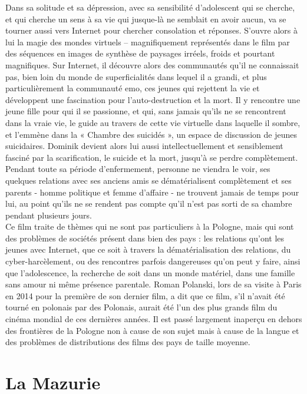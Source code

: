 \documentclass[12pt]{amsart}
\begin{document}
Dans sa solitude et sa dépression, avec sa sensibilité d’adolescent qui se cherche, et qui cherche un sens à sa vie qui jusque-là ne semblait en avoir aucun, va se tourner aussi vers Internet pour chercher consolation et réponses. S’ouvre alors à lui la magie des mondes virtuels – magnifiquement représentés dans le film par des séquences en images de synthèse de paysages irréels, froids et pourtant magnifiques. Sur Internet, il découvre alors des communautés qu’il ne connaissait pas, bien loin du monde de superficialités dans lequel il a grandi, et plus particulièrement la communauté emo, ces jeunes qui rejettent la vie et développent une fascination pour l’auto-destruction et la mort. Il y rencontre une jeune fille pour qui il se passionne, et qui, sans jamais qu’ils ne se rencontrent dans la vraie vie, le guide au travers de cette vie virtuelle dans laquelle il sombre, et l’emmène dans la « Chambre des suicidés », un espace de discussion de jeunes suicidaires. Dominik devient alors lui aussi intellectuellement et sensiblement fasciné par la scarification, le suicide et la mort, jusqu’à se perdre complètement. Pendant toute sa période d'enfermement, personne ne viendra le voir, ses quelques relations avec ses anciens amis se dématérialisent complètement et ses parents - homme politique et femme d'affaire - ne trouvent jamais de temps pour lui, au point qu'ils ne se rendent pas compte qu'il n'est pas sorti de sa chambre pendant plusieurs jours. \\
Ce film traite de thèmes qui ne sont pas particuliers à la Pologne, mais qui sont des problèmes de sociétés présent dans bien des pays : les relations qu'ont les jeunes avec Internet, que ce soit à travers la dématérialisation des relations, du cyber-harcèlement, ou des rencontres parfois dangereuses qu'on peut y faire, ainsi que l'adolescence, la recherche de soit dans un monde matériel, dans une famille sans amour ni même présence parentale. Roman Polanski, lors de sa visite à Paris en 2014 pour la première de son dernier film, a dit que ce film, s'il n'avait été tourné en polonais par des Polonais, aurait été l'un des plus grands film du cinéma mondial de ces dernières années. Il est passé largement inaperçu en dehors des frontières de la Pologne non à cause de son sujet mais à cause de la langue et des problèmes de distributions des films des pays de taille moyenne. 
\clearpage
\section{La Mazurie}
\end{document}
